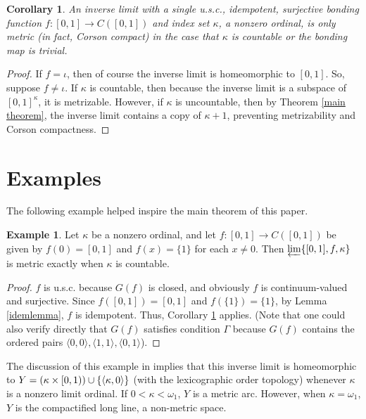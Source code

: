 \documentclass{amsart}
\newtheorem{corollary}[theorem]{Corollary}
\theoremstyle{definition}
\newtheorem{example}[theorem]{Example}
\begin{document}
\begin{corollary} \label{main corr}
An inverse limit with a single u.s.c., idempotent, surjective bonding function $f: [0,1] \rightarrow C([0,1])$ and index set $\kappa$, a nonzero ordinal, is only metric (in fact, Corson compact) in the case that $\kappa$ is countable or the bonding map is trivial.
\end{corollary}

\begin{proof}
If $f = \iota$, then of course the inverse limit is homeomorphic to $[0,1]$. So, suppose $f \ne \iota$. If $\kappa$ is countable, then because the inverse limit is a subspace of $[0,1]^{\kappa}$, it is metrizable. However, if $\kappa$ is uncountable, then by Theorem \ref{main theorem}, the inverse limit contains a copy of $\kappa + 1$, preventing metrizability and Corson compactness.
\end{proof}

\section{Examples}

The following example helped inspire the main theorem of this paper.

\begin{example} \label{ex1} Let $\kappa$ be a nonzero ordinal, and let $f: [0,1] \rightarrow C([0,1])$ be given by $f(0) = [0,1]$ and $f(x) = \{1\}$ for each $x \ne 0$. Then $\varprojlim \{ [0,1], f, \kappa \}$ is metric exactly when $\kappa$ is countable.
\end{example}

\begin{proof} $f$ is u.s.c. because $G(f)$ is closed, and obviously $f$ is continuum-valued and surjective. Since $f([0,1]) = [0,1]$ and $f(\{1\}) = \{1\}$, by Lemma \ref{idemlemma}, $f$ is idempotent. Thus, Corollary \ref{main corr} applies. (Note that one could also verify directly that $G(f)$ satisfies condition $\Gamma$ because $G(f)$ contains the ordered pairs $\langle 0,0 \rangle, \langle 1,1 \rangle, \langle 0,1 \rangle$).
\end{proof}

The discussion of this example in \cite{varagona} implies that this inverse limit is homeomorphic to $Y = (\kappa \times [0,1)) \cup \{\langle \kappa, 0 \rangle\}$ (with the lexicographic order topology) whenever $\kappa$ is a nonzero limit ordinal. If $0 < \kappa < \omega_1$, $Y$ is a metric arc. However, when $\kappa = \omega_1$, $Y$ is the compactified long line, a non-metric space.
\end{document}
